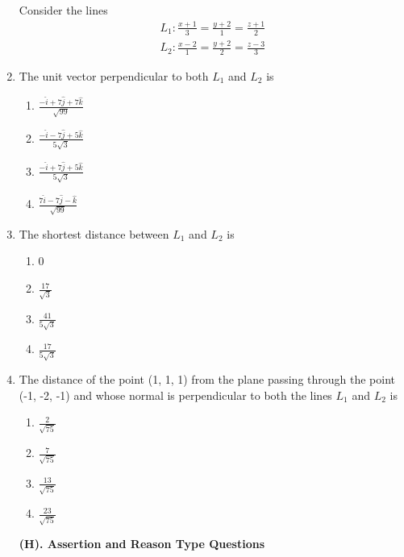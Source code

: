 \begin{enumerate}[label=\arabic*.,ref=\thesubsection.\theenumi]
Consider the lines
\begin{align*}
L_1: \frac{x + 1}{3} = \frac{y + 2}{1} = \frac{z + 1}{2}
\end{align*}
\begin{align*}
L_2: \frac{x - 2}{1}=\frac{y + 2}{2} = \frac{z - 3}{3}
\end{align*}
\item The unit vector perpendicular to both $L_1$ and $L_2$ is
\begin{enumerate}
\item $\frac{-\hat{i} + 7\hat{j} + 7\hat{k}}{\sqrt{99}}$
\item $\frac{-\hat{i} - 7\hat{j} + 5\hat{k}}{5\sqrt{3}}$
\item $\frac{-\hat{i} + 7\hat{j} + 5\hat{k}}{5\sqrt{3}}$
\item $\frac{7\hat{i} - 7\hat{j} - \hat{k}}{\sqrt{99}}$
\end{enumerate}

\item The shortest distance between $L_1$ and $L_2$ is
\begin{enumerate}
\item 0
\item $\frac{17}{\sqrt{3}}$
\item $\frac{41}{5\sqrt{3}}$
\item $\frac{17}{5\sqrt{3}}$
\end{enumerate}

\item The distance of the point (1, 1, 1) from the plane passing through the point (-1, -2, -1) and whose normal is perpendicular to both the lines $L_1$ and $L_2$ is
\begin{enumerate}
\item $\frac{2}{\sqrt{75}}$
\item $\frac{7}{\sqrt{75}}$
\item $\frac{13}{\sqrt{75}}$
\item $\frac{23}{\sqrt{75}}$
\end{enumerate}

\textbf{(H). Assertion and Reason Type Questions}


\end{enumerate}
